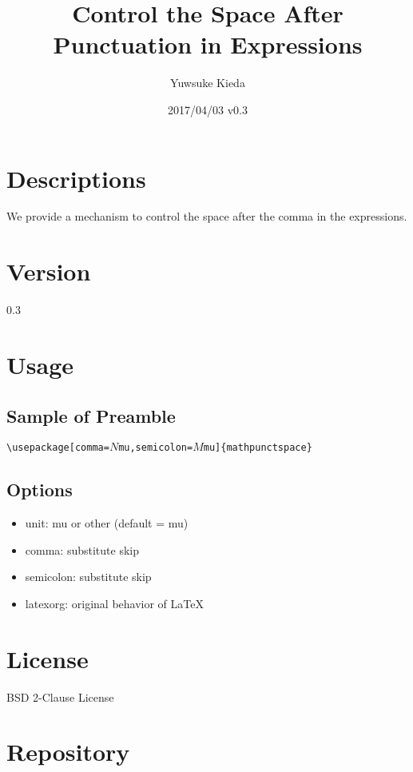 \documentclass{article}
\title{Control the Space After Punctuation in Expressions}
\author{Yuwsuke Kieda}
\date{2017/04/03 v0.3}
\begin{document}
\maketitle

\section{Descriptions}

We provide a mechanism to control the space after the comma in the expressions.

\section{Version}

0.3

\section{Usage}

\subsection{Sample of Preamble}

\noindent
\verb!\!\texttt{usepackage[comma=$N$mu,semicolon=$M$mu]}\verb!{mathpunctspace}!

\subsection{Options}

\begin{itemize}
 \item unit: mu or other (default = mu)
 \item comma: substitute skip
 \item semicolon: substitute skip
 \item latexorg: original behavior of LaTeX
\end{itemize}

\section{License}

BSD 2-Clause License

\section{Repository}
\end{document}
